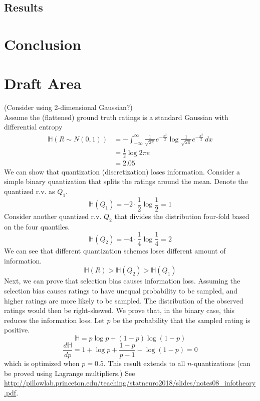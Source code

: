 \documentclass[12pt, letterpaper]{article}
\theoremstyle{definition}\newtheorem*{definition}{Definition}
\theoremstyle{definition}\newtheorem*{example}{Example}
\theoremstyle{definition}\newtheorem*{remark}{Remark}
\def\HH{\mathbb{H}}
\begin{document}
\subsection{Results}

\section{Conclusion}

\section{Draft Area}
 (Consider using 2-dimensional Gaussian?)\\
Assume the (flattened) ground truth ratings is a standard Gaussian with differential entropy
\begin{align*} \HH(R\sim N(0, 1)) & = -\int_{-\infty}^\infty \frac{1}{\sqrt{2\pi}}e^{-\frac{x^2}{2}} \log \frac{1}{\sqrt{2\pi}}e^{-\frac{x^2}{2}} \, dx \\
                                  & = \frac{1}{2}\log 2\pi e                                                                                            \\
                                  & = 2.05
\end{align*}
We can show that quantization (discretization) loses information. Consider
a simple binary quantization that splits the ratings around the mean. Denote the quantized r.v. as $Q_1$.
\[ \HH(Q_1) = -2 \cdot \frac{1}{2} \log \frac{1}{2} = 1 \]
Consider another quantized r.v. $Q_2$ that divides the distribution four-fold based on the four quantiles.
\[ \HH(Q_2) = -4 \cdot \frac{1}{4} \log \frac{1}{4} = 2 \]
We can see that different quantization schemes loses different amount of information.
\[ \HH(R) > \HH(Q_2) > \HH(Q_1) \]
Next, we can prove that selection bias causes information loss. Assuming the selection bias causes ratings to have unequal probability to be sampled, and higher ratings are more likely to be sampled. The distribution of the observed ratings would then be right-skewed. We prove that, in the binary case, this reduces the information loss. Let $p$ be the probability that the sampled rating is positive.
\[\HH = p\log p + (1-p) \log (1-p) \]
\[ \frac{d\HH}{dp} = 1 + \log p + \frac{1-p}{p-1} - \log(1-p) = 0 \]
which is optimized when $p = 0.5$. This result extends to all $n$-quantizations (can be proved using Lagrange multipliers.) See \url{http://pillowlab.princeton.edu/teaching/statneuro2018/slides/notes08_infotheory.pdf}.
\end{document}

